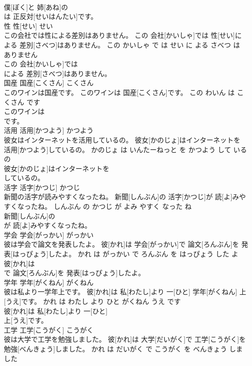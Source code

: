 \documentclass[8pt]{extreport}
\begin{document}
\begin{CJK}{UTF8}{min}
\\	僕[ぼく]と 姉[あね]の
\\	は 正反対[せいはんたい]です。			
\\	性	性[せい]	せい	
\\	この会社では性による差別はありません。	この 会社[かいしゃ]では 性[せい]による 差別[さべつ]はありません。	この かいしゃ で は せい に よる さべつ は ありません	
\\	この 会社[かいしゃ]では
\\	による 差別[さべつ]はありません。			
\\	国産	国産[こくさん]	こくさん	
\\	このワインは国産です。	このワインは 国産[こくさん]です。	この わいん は こくさん です	
\\	このワインは
\\	です。			
\\	活用	活用[かつよう]	かつよう	
\\	彼女はインターネットを活用しているの。	彼女[かのじょ]はインターネットを 活用[かつよう]しているの。	かのじょ は いんたーねっと を かつよう して いる の	
\\	彼女[かのじょ]はインターネットを
\\	しているの。			
\\	活字	活字[かつじ]	かつじ	
\\	新聞の活字が読みやすくなったね。	新聞[しんぶん]の 活字[かつじ]が 読[よ]みやすくなったね。	しんぶん の かつじ が よみ やすく なった ね	
\\	新聞[しんぶん]の
\\	が 読[よ]みやすくなったね。			
\\	学会	学会[がっかい]	がっかい	
\\	彼は学会で論文を発表したよ。	彼[かれ]は 学会[がっかい]で 論文[ろんぶん]を 発表[はっぴょう]したよ。	かれ は がっかい で ろんぶん を はっぴょう した よ	
\\	彼[かれ]は
\\	で 論文[ろんぶん]を 発表[はっぴょう]したよ。			
\\	学年	学年[がくねん]	がくねん	
\\	彼は私より一学年上です。	彼[かれ]は 私[わたし]より 一[ひと] 学年[がくねん] 上[うえ]です。	かれ は わたし より ひと がくねん うえ です	
\\	彼[かれ]は 私[わたし]より 一[ひと]
\\	上[うえ]です。			
\\	工学	工学[こうがく]	こうがく	
\\	彼は大学で工学を勉強しました。	彼[かれ]は 大学[だいがく]で 工学[こうがく]を 勉強[べんきょう]しました。	かれ は だいがく で こうがく を べんきょう しました	

\end{CJK}
\end{document}
